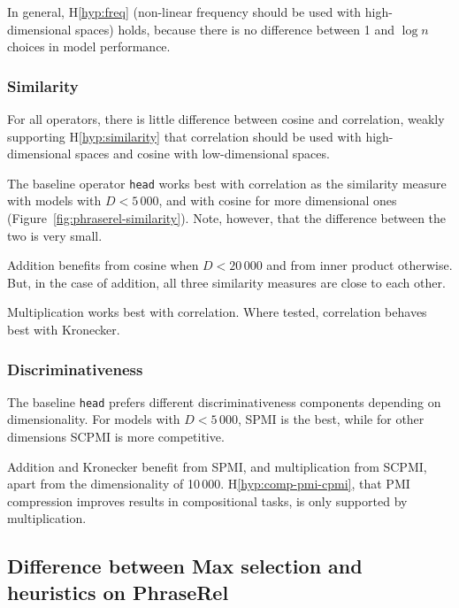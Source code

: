 In general, H\ref{hyp:freq} (non-linear frequency should be used with high-dimensional spaces) holds, because there is no difference between 1 and $\log n$ choices in model performance.



\subsubsection{Similarity}
\label{sec:similarity-phraserel}

For all operators, there is little difference between cosine and correlation, weakly supporting H\ref{hyp:similarity} that correlation should be used with high-dimensional spaces and cosine with low-dimensional spaces.

The baseline operator \texttt{head} works best with correlation as the similarity measure with models with $D < 5\,000$, and with cosine for more dimensional ones (Figure~\ref{fig:phraserel-similarity}). Note, however, that the difference between the two is very small.

Addition benefits from cosine when $D < 20\,000$ and from inner product otherwise. But, in the case of addition, all three similarity measures are close to each other.

Multiplication works best with correlation. Where tested, correlation behaves best with Kronecker.

\subsubsection{Discriminativeness}
\label{sec:discriminativeness-phraserel}



The baseline \texttt{head} prefers different discriminativeness components depending on dimensionality. For models with $D < 5\,000$, SPMI is the best, while for other dimensions SCPMI is more competitive.

Addition and Kronecker benefit from SPMI, and multiplication from SCPMI, apart from the dimensionality of 10\,000. H\ref{hyp:comp-pmi-cpmi}, that PMI compression improves results in compositional tasks, is only supported by multiplication.

\subsection{Difference between Max selection and heuristics on PhraseRel}
\label{sec:diff-phraserel}

